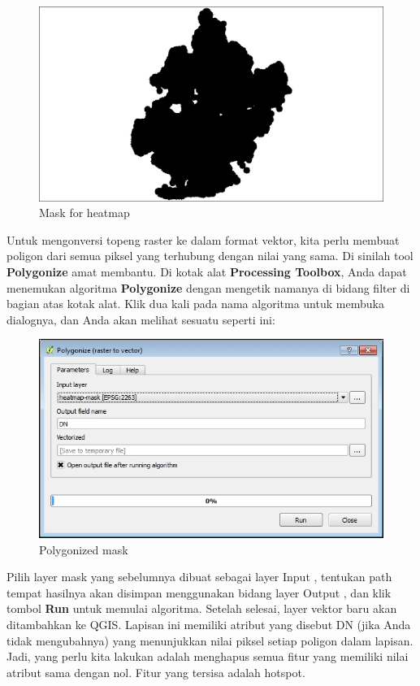 \documentclass[]{book}
\begin{document}
\begin{figure}

{\centering \includegraphics[width=0.8\linewidth]{images/04/fig79} 

}

\caption{Mask for heatmap}\label{fig:fig1479}
\end{figure}

Untuk mengonversi topeng raster ke dalam format vektor, kita perlu membuat poligon dari semua piksel yang terhubung dengan nilai yang sama. Di sinilah tool \textbf{Polygonize} amat membantu. Di kotak alat \textbf{Processing Toolbox}, Anda dapat menemukan algoritma \textbf{Polygonize} dengan mengetik namanya di bidang filter di bagian atas kotak alat. Klik dua kali pada nama algoritma untuk membuka dialognya, dan Anda akan melihat sesuatu seperti ini:

\begin{figure}

{\centering \includegraphics[width=0.8\linewidth]{images/04/fig80} 

}

\caption{Polygonized mask}\label{fig:fig1480}
\end{figure}

Pilih layer mask yang sebelumnya dibuat sebagai layer Input , tentukan path tempat hasilnya akan disimpan menggunakan bidang layer Output , dan klik tombol \textbf{Run} untuk memulai algoritma. Setelah selesai, layer vektor baru akan ditambahkan ke QGIS. Lapisan ini memiliki atribut yang disebut DN (jika Anda tidak mengubahnya) yang menunjukkan nilai piksel setiap poligon dalam lapisan. Jadi, yang perlu kita lakukan adalah menghapus semua fitur yang memiliki nilai atribut sama dengan nol. Fitur yang tersisa adalah hotspot.
\end{document}
